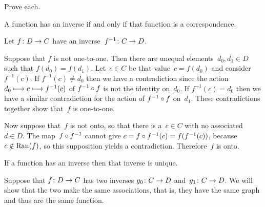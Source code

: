 \documentclass{ibl}  %
\begin{document}
\begin{problem} \label{PropertiesOfInverses}
Prove each.
\begin{exes}
\begin{exercise} 
  A function has an inverse if and only if that 
  function is a correspondence.
\end{exercise}
\begin{answer}
  Let $\mbox{$f\colon D\to C$}$ have an inverse~$\mbox{$f^{-1}\colon C\to D$}$.

  Suppose that $f$ is not one-to-one.
  Then there are unequal elements~$d_0,d_1\in D$
  such that $f(d_0)=f(d_1)$.
  Let~$c\in C$ be that value~$c=f(d_0)$ and consider~$f^{-1}(c)$.
  If $f^{-1}(c)\neq d_0$ then we have a contradiction since the 
  action $d_0\stackrel{}{\longmapsto}c\stackrel{}{\longmapsto}f^{-1}(c)$
  of $f^{-1}\mathbin{\circ} f$ is not the identity on~$d_0$.
  If $f^{-1}(c)=d_0$ then we have a similar contradiction for the
  action of $f^{-1}\mathbin{\circ} f$ on~$d_1$.
  These contradictions together show that~$f$ is one-to-one.
   
  Now suppose that~$f$ is not onto,
  so that there is a~$c\in C$ with no associated~$d\in D$.
  The map~$f\mathbin{\circ} f^{-1}$
  cannot give $c=f\mathbin{\circ} f^{-1}(c)=f(f^{-1}(c))$, 
  because $c\notin\operatorname{Ran}(f)$, so this supposition yields a contradiction.
  Therefore~$f$ is onto.  
\end{answer}
\begin{exercise} 
  If a function has an inverse then that inverse
  is unique.
\end{exercise}
\begin{answer}
  Suppose that $\mbox{$f\colon D\to C$}$ has two inverses $\mbox{$g_0\colon C\to D$}$
  and~$\mbox{$g_1\colon C\to D$}$.
  We will show that the two make the same associations, that is, they 
  have the same graph and
  thus are the same function.


\end{answer}
\end{exes}
\end{problem}
\end{document}
